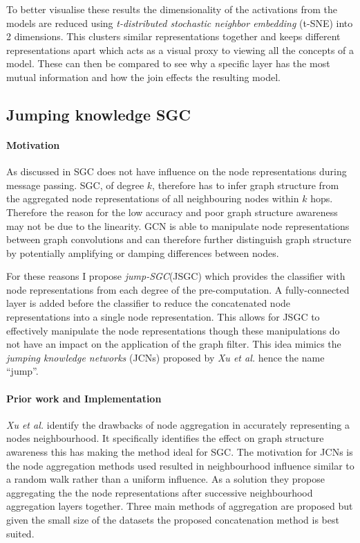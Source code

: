 To better visualise these results the dimensionality of the activations from the models are reduced using \emph{t-distributed stochastic neighbor embedding} (t-SNE) into 2 dimensions.
This clusters similar representations together and keeps different representations apart which acts as a visual proxy to viewing all the concepts of a model.
These can then be compared to see why a specific layer has the most mutual information and how the join effects the resulting model.

\subsection{Jumping knowledge SGC}
\paragraph{Motivation}
As discussed in  SGC does not have influence on the node representations during message passing.
SGC, of degree $k$, therefore has to infer graph structure from the aggregated node representations of all neighbouring nodes within $k$ hops.
Therefore the reason for the low accuracy and poor graph structure awareness may not be due to the linearity.
GCN is able to manipulate node representations between graph convolutions and can therefore further distinguish graph structure by potentially amplifying or damping differences between nodes.

For these reasons I propose \emph{jump-SGC}(JSGC) which provides the classifier with node representations from each degree of the pre-computation.
A fully-connected layer is added before the classifier to reduce the concatenated node representations into a single node representation.
This allows for JSGC to effectively manipulate the node representations though these manipulations do not have an impact on the application of the graph filter.
This idea mimics the \emph{jumping knowledge networks} (JCNs) proposed by \textit{Xu et al.}\cite{xu2018representation} hence the name ``jump''.

\paragraph{Prior work and Implementation}
\textit{Xu et al.}\cite{xu2018representation} identify the drawbacks of node aggregation in accurately representing a nodes neighbourhood.
It specifically identifies the effect on graph structure awareness this has making the method ideal for SGC.
The motivation for JCNs is the node aggregation methods used resulted in neighbourhood influence similar to a random walk rather than a uniform influence.
As a solution they propose aggregating the the node representations after successive neighbourhood aggregation layers together.
Three main methods of aggregation are proposed but given the small size of the datasets the proposed concatenation method is best suited.


